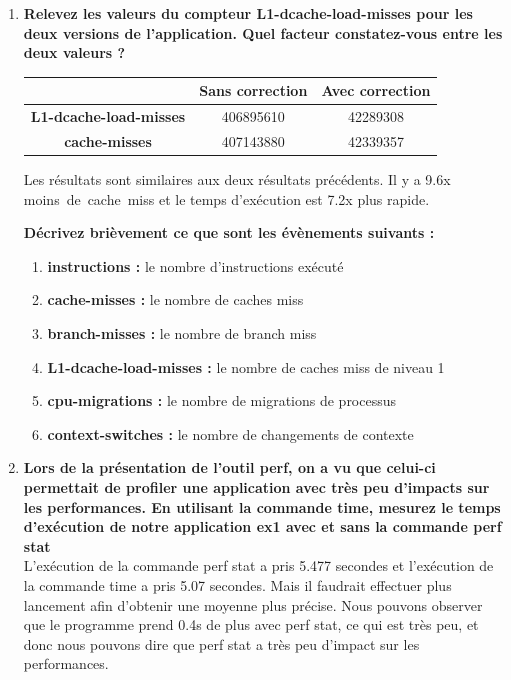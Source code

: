 \documentclass[
	a4paper, %
	10pt, %
]{CSUniSchoolLabReport}
\begin{document}
\begin{enumerate}[label=\textbf{\arabic*}]
\item \textbf{Relevez les valeurs du compteur L1-dcache-load-misses pour les deux versions de l’application. Quel facteur constatez-vous entre les deux valeurs ?}

\begin{center}
	\begin{tabular}{|c|c|c|}
		\hline
		& \textbf{Sans correction} & \textbf{Avec correction} \\
		\hline
		\textbf{L1-dcache-load-misses} & 406895610 & 42289308 \\
		\hline
		\textbf{cache-misses} & 407143880 & 42339357 \\
		\hline
	\end{tabular}
\end{center}
Les r\'esultats sont similaires aux deux r\'esultats pr\'ec\'edents. Il y a 9.6x moins\ de\ cache\ miss et le temps d'ex\'ecution est 7.2x plus rapide.

\textbf{Décrivez brièvement ce que sont les évènements suivants :}
\begin{enumerate}[label=\textbf{\alph*}]
	\item \textbf{instructions :} le nombre d'instructions ex\'ecuté
	\item \textbf{cache-misses :} le nombre de caches miss
	\item \textbf{branch-misses :} le nombre de branch miss
	\item \textbf{L1-dcache-load-misses :} le nombre de caches miss de niveau 1
	\item \textbf{cpu-migrations :} le nombre de migrations de processus
	\item \textbf{context-switches :} le nombre de changements de contexte
\end{enumerate}

\item \textbf{Lors de la présentation de l’outil perf, on a vu que celui-ci permettait de profiler une application avec très peu d’impacts sur les performances. En utilisant la commande time, mesurez le temps d’exécution de notre application ex1 avec et sans la commande perf stat}\\
L'ex\'ecution de la commande perf stat a pris 5.477 secondes et l'ex\'ecution de la commande time a pris 5.07 secondes. Mais il faudrait effectuer plus lancement afin d'obtenir une moyenne plus précise.
Nous pouvons observer que le programme prend 0.4s de plus avec perf stat, ce qui est tr\`es peu, et donc nous pouvons dire que perf stat a très peu d'impact sur les performances.

\end{enumerate}
\end{document}
